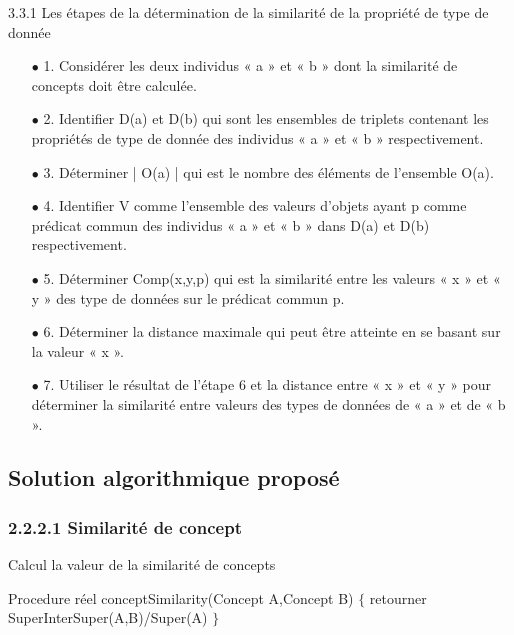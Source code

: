         3.3.1 Les étapes de la détermination de la similarité de la propriété de type de donnée
        \begin{itemize}


	       \item[\quad $\bullet$]1. Considérer les deux individus « a » et « b » dont la similarité de concepts doit être calculée.
            \item[\quad $\bullet$]2. Identifier D(a) et D(b) qui sont les ensembles de triplets contenant les propriétés de type de
 	      donnée des individus « a » et « b » respectivement.
	       \item[\quad $\bullet$]3. Déterminer | O(a) | qui est le nombre des éléments de l’ensemble O(a).
	       \item[\quad $\bullet$]4. Identifier V comme l’ensemble des valeurs d’objets ayant p comme prédicat commun des
     	individus « a » et « b » dans D(a) et D(b) respectivement.
            \item[\quad $\bullet$]5. Déterminer Comp(x,y,p) qui est la similarité entre les valeurs « x » et « y » des type de données sur le prédicat commun p.
            \item[\quad $\bullet$]6. Déterminer la distance maximale qui peut être atteinte en se basant sur la valeur « x ».
            \item[\quad $\bullet$]7. Utiliser le résultat de l’étape 6 et la distance entre « x » et « y » pour déterminer la similarité entre valeurs des types de données de « a » et de « b ».
        \end{itemize}

\subsection{Solution algorithmique proposé}
\subsubsection{2.2.2.1 Similarité de concept}

\begin{algorithm}[H]
\caption{ Calcul la valeur de la similarité de concepts}
\begin{algorithmic}[1]
\State Procedure réel conceptSimilarity(Concept A,Concept B)
\State $\{$
\State retourner SuperInterSuper(A,B)/Super(A)
\State  $\}$
\end{algorithmic}
\end{algorithm}

